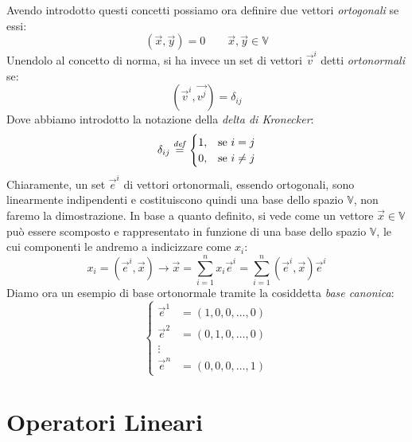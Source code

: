 Avendo introdotto questi concetti possiamo ora definire due vettori \textit{ortogonali} se essi:
\begin{equation}
    (\vec{x},\vec{y})=0 \qquad \vec{x},\vec{y} \in \mathbb{V}
\end{equation}
Unendolo al concetto di norma, si ha invece un set di vettori $\vec{v}^i$ detti \textit{ortonormali} se:
\begin{equation}
    (\vec{v}^i,\vec{v^j})=\delta_{ij}
\end{equation}
Dove abbiamo introdotto la notazione della \textit{delta di Kronecker}:
\begin{equation}
    \label{def:delta_Kronecker}
    \delta_{ij}\overset{\mathit{def}}{=}
    \begin{cases}
        1, & \text{se } i=j \\
        0, & \text{se } i\neq j
    \end{cases}
\end{equation}
Chiaramente, un set $\vec{e}^i$ di vettori ortonormali, essendo ortogonali, sono linearmente indipendenti e costituiscono quindi una base dello spazio $\mathbb{V}$, non faremo la dimostrazione. In base a quanto definito, si vede come un vettore $\vec{x}\in\mathbb{V}$ può essere scomposto e rappresentato in funzione di una base dello spazio $\mathbb{V}$, le cui componenti le andremo a indicizzare come $x_i$:
\begin{equation*}
    x_i = (\vec{e}^i,\vec{x}) \longrightarrow
    \vec{x} = \sum_{i=1}^{n} x_i \vec{e}^i =
    \sum_{i=1}^{n} (\vec{e}^i,\vec{x}) \vec{e}^i
\end{equation*}
Diamo ora un esempio di base ortonormale tramite la cosiddetta \textit{base canonica}:
\begin{equation*}
    \begin{cases}
        \vec{e}^1 &= (1,0,0,\dots,0)\\
        \vec{e}^2 &= (0,1,0,\dots,0)\\
        \vdots \\
        \vec{e}^n &= (0,0,0,\dots,1)
    \end{cases}
\end{equation*}


\section{Operatori Lineari}

